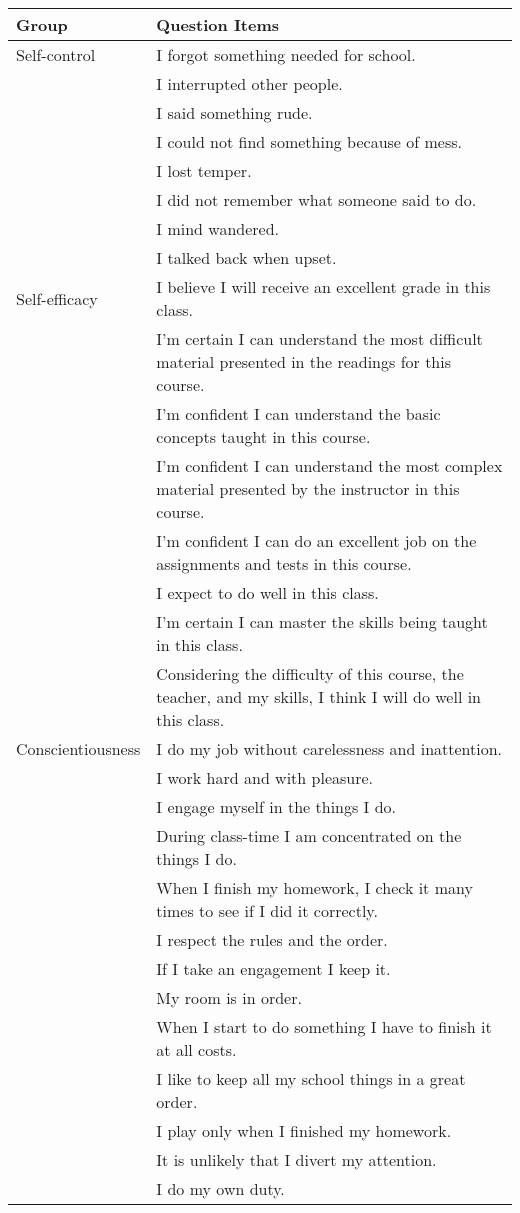 \begin{tabular}{lp{13cm}}
\hline \hline 
Group & Question Items \\
\hline 
Self-control & I forgot something needed for school. \\
 & I interrupted other people. \\
 & I said something rude. \\
 & I could not find something because of mess. \\
 & I lost temper. \\
 & I did not remember what someone said to do. \\
 & I mind wandered. \\
 & I talked back when upset. \\
Self-efficacy & I believe I will receive an excellent grade in this class. \\
 & I'm certain I can understand the most difficult material presented in the readings for this course. \\
 & I'm confident I can understand the basic concepts taught in this course. \\
 & I'm confident I can understand the most complex material presented by the instructor in this course. \\
 & I'm confident I can do an excellent job on the assignments and tests in this course. \\
 & I expect to do well in this class. \\
 & I'm certain I can master the skills being taught in this class. \\
 & Considering the difficulty of this course, the teacher, and my skills, I think I will do well in this class. \\
Conscientiousness & I do my job without carelessness and inattention. \\
 & I work hard and with pleasure. \\
 & I engage myself in the things I do. \\
 & During class-time I am concentrated on the things I do. \\
 & When I finish my homework, I check it many times to see if I did it correctly. \\
 & I respect the rules and the order. \\
 & If I take an engagement I keep it. \\
 & My room is in order. \\
 & When I start to do something I have to finish it at all costs. \\
 & I like to keep all my school things in a great order. \\
 & I play only when I finished my homework. \\
 & It is unlikely that I divert my attention. \\
 & I do my own duty. \\
\hline \hline
\end{tabular}